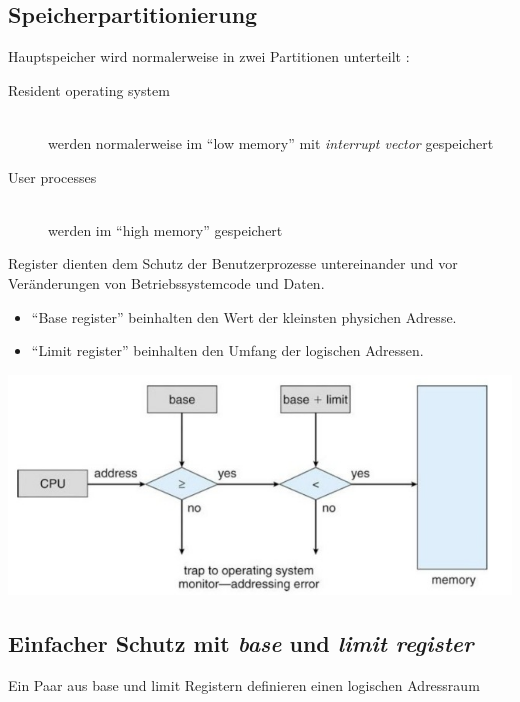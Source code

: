 \documentclass[a4paper]{scrreprt}
\begin{document}
\subsection{Speicherpartitionierung}

Hauptspeicher wird normalerweise in zwei Partitionen unterteilt :
\begin{description}
\item[Resident operating system]\ \\ werden normalerweise im "`low memory"' mit  \textit{interrupt vector} gespeichert
\item[User processes]\ \\werden im "`high memory"' gespeichert
\end{description}

Register dienten dem Schutz der Benutzerprozesse untereinander und vor Veränderungen von Betriebssystemcode und Daten.
\begin{itemize}
\item "`Base register"' beinhalten den Wert der kleinsten physichen Adresse.
\item "`Limit register"' beinhalten den Umfang der logischen Adressen.
\end{itemize}

\begin{center}
		\includegraphics[scale=0.5] {baseandlimit.png}
\end{center}

\subsection{Einfacher Schutz mit \textit{base} und \textit{limit register}}

Ein Paar aus base und limit Registern definieren einen logischen Adressraum
\end{document}
